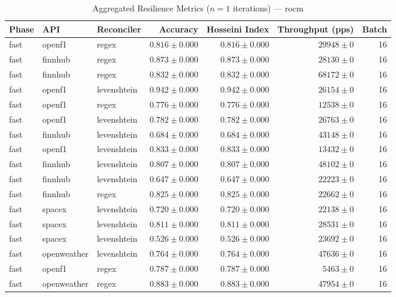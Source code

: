 
\begin{table}[htbp]
\caption{Aggregated Resilience Metrics ($n=1$ iterations) --- rocm}
\begin{tabular}{l l l r r r r}
\hline
Phase & API & Reconciler & Accuracy & Hosseini Index & Throughput (pps) & Batch \\
\hline
fast & openf1 & regex & $0.816\pm0.000$ & $0.816\pm0.000$ & $29948\pm0$ & 16 \\
fast & finnhub & regex & $0.873\pm0.000$ & $0.873\pm0.000$ & $28130\pm0$ & 16 \\
fast & finnhub & regex & $0.832\pm0.000$ & $0.832\pm0.000$ & $68172\pm0$ & 16 \\
fast & openf1 & levenshtein & $0.942\pm0.000$ & $0.942\pm0.000$ & $26154\pm0$ & 16 \\
fast & openf1 & regex & $0.776\pm0.000$ & $0.776\pm0.000$ & $12538\pm0$ & 16 \\
fast & openf1 & levenshtein & $0.782\pm0.000$ & $0.782\pm0.000$ & $26763\pm0$ & 16 \\
fast & finnhub & levenshtein & $0.684\pm0.000$ & $0.684\pm0.000$ & $43148\pm0$ & 16 \\
fast & openf1 & levenshtein & $0.833\pm0.000$ & $0.833\pm0.000$ & $13432\pm0$ & 16 \\
fast & finnhub & levenshtein & $0.807\pm0.000$ & $0.807\pm0.000$ & $48102\pm0$ & 16 \\
fast & finnhub & levenshtein & $0.647\pm0.000$ & $0.647\pm0.000$ & $22223\pm0$ & 16 \\
fast & finnhub & regex & $0.825\pm0.000$ & $0.825\pm0.000$ & $22662\pm0$ & 16 \\
fast & spacex & levenshtein & $0.720\pm0.000$ & $0.720\pm0.000$ & $22138\pm0$ & 16 \\
fast & spacex & levenshtein & $0.811\pm0.000$ & $0.811\pm0.000$ & $28531\pm0$ & 16 \\
fast & spacex & levenshtein & $0.526\pm0.000$ & $0.526\pm0.000$ & $23692\pm0$ & 16 \\
fast & openweather & levenshtein & $0.764\pm0.000$ & $0.764\pm0.000$ & $47636\pm0$ & 16 \\
fast & openf1 & regex & $0.787\pm0.000$ & $0.787\pm0.000$ & $5463\pm0$ & 16 \\
fast & openweather & regex & $0.883\pm0.000$ & $0.883\pm0.000$ & $47954\pm0$ & 16 \\

\end{tabular}
\end{table}
